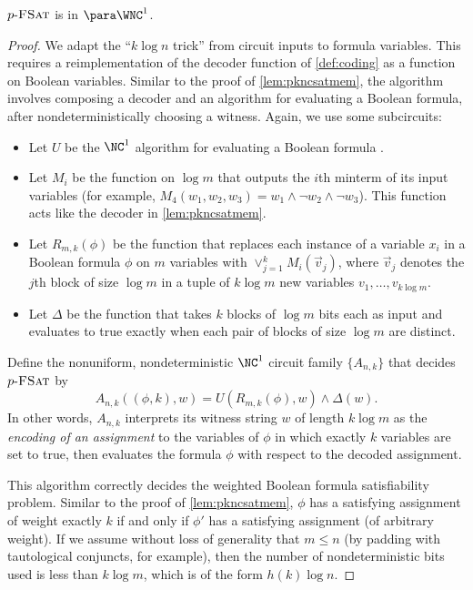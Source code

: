 \begin{lemma}\label{lem:pfsatmem}
  $p \textnormal{-} \textsc{FSat}$ is in $\para \WNC^1$.
\end{lemma}
\begin{proof}
  We adapt the ``$k \log n$ trick'' from circuit inputs to formula variables.
  This requires a reimplementation of the decoder function of \autoref{def:coding} as a function on Boolean variables.
  Similar to the proof of \autoref{lem:pkncsatmem}, the algorithm involves composing a decoder and an algorithm for evaluating a Boolean formula, after nondeterministically choosing a witness.
  Again, we use some subcircuits:
  \begin{itemize}
  \item Let $U$ be the $\NC^1$ algorithm for evaluating a Boolean formula \autocites{buss87, bcgr92}.
  \item
    Let $M_i$ be the function on $\log m$ that outputs the $i$th minterm of its input variables (for example, $M_4(w_1, w_2, w_3) = w_1 \land \lnot w_2 \land \lnot w_3$).
    This function acts like the decoder in \autoref{lem:pkncsatmem}.
  \item
    Let $R_{m, k}(\phi)$ be the function that replaces each instance of a variable $x_i$ in a Boolean formula $\phi$ on $m$ variables with $\vee_{j = 1}^k M_i(\vec{v}_j)$, where $\vec{v}_j$ denotes the $j$th block of size $\log m$ in a tuple of $k \log m$ new variables $v_1, \dotsc, v_{k \log m}$.
  \item Let $\Delta$ be the function that takes $k$ blocks of $\log m$ bits each as input and evaluates to true exactly when each pair of blocks of size $\log m$ are distinct.
  \end{itemize}
  Define the nonuniform, nondeterministic $\NC^1$ circuit family $\{A_{n, k}\}$ that decides $p \textnormal{-} \textsc{FSat}$ by
  \[
  A_{n, k}((\phi, k), w) = U(R_{m, k}(\phi), w) \land \Delta(w).
  \]
  In other words, $A_{n, k}$ interprets its witness string $w$ of length $k \log m$ as the \emph{encoding of an assignment} to the variables of $\phi$ in which exactly $k$ variables are set to true, then evaluates the formula $\phi$ with respect to the decoded assignment.

  This algorithm correctly decides the weighted Boolean formula satisfiability problem.
  Similar to the proof of \autoref{lem:pkncsatmem}, $\phi$ has a satisfying assignment of weight exactly $k$ if and only if $\phi'$ has a satisfying assignment (of arbitrary weight).
  If we assume without loss of generality that $m \leq n$ (by padding with tautological conjuncts, for example), then the number of nondeterministic bits used is less than $k \log m$, which is of the form $h(k) \log n$.


\end{proof}
